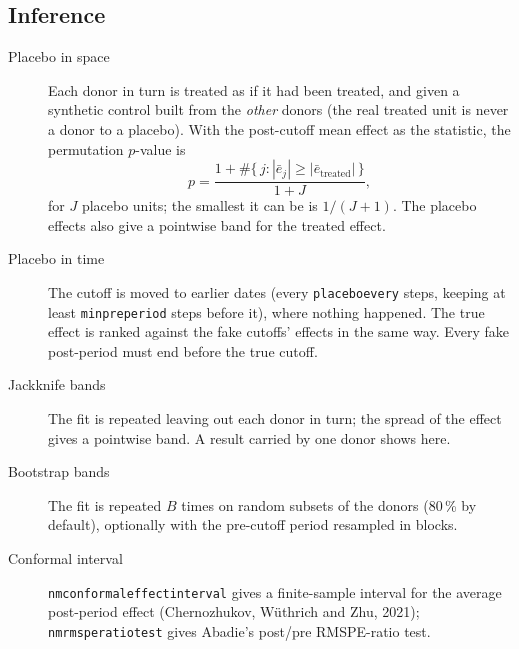 \documentclass[11pt]{report}
\newcommand{\codeunderscore}{\textunderscore\allowbreak}
\newcommand{\code}[1]{\texttt{\let\_\codeunderscore #1}}
\begin{document}
\subsection{Inference}\label{sec:scminference}
\begin{description}
  \item[Placebo in space] Each donor in turn is treated as if it had been treated, and
        given a synthetic control built from the \emph{other} donors (the real treated
        unit is never a donor to a placebo). With the post-cutoff mean effect as the
        statistic, the permutation $p$-value is
        \begin{equation}
          p = \frac{1 + \#\{\,j : |\bar{e}_j| \ge |\bar{e}_\text{treated}|\,\}}{1 + J},
        \end{equation}
        for $J$ placebo units; the smallest it can be is $1/(J+1)$. The placebo effects
        also give a pointwise band for the treated effect.
  \item[Placebo in time] The cutoff is moved to earlier dates (every \code{placebo\_every}
        steps, keeping at least \code{min\_pre\_period} steps before it), where nothing
        happened. The true effect is ranked against the fake cutoffs' effects in the same
        way. Every fake post-period must end before the true cutoff.
  \item[Jackknife bands] The fit is repeated leaving out each donor in turn; the spread of
        the effect gives a pointwise band. A result carried by one donor shows here.
  \item[Bootstrap bands] The fit is repeated $B$ times on random subsets of the donors
        (80\,\% by default), optionally with the pre-cutoff period resampled in blocks.
  \item[Conformal interval] \code{nm\_conformal\_effect\_interval} gives a finite-sample
        interval for the average post-period effect (Chernozhukov, W\"uthrich and Zhu,
        2021); \code{nm\_rmspe\_ratio\_test} gives Abadie's post/pre RMSPE-ratio test.
\end{description}
\end{document}
